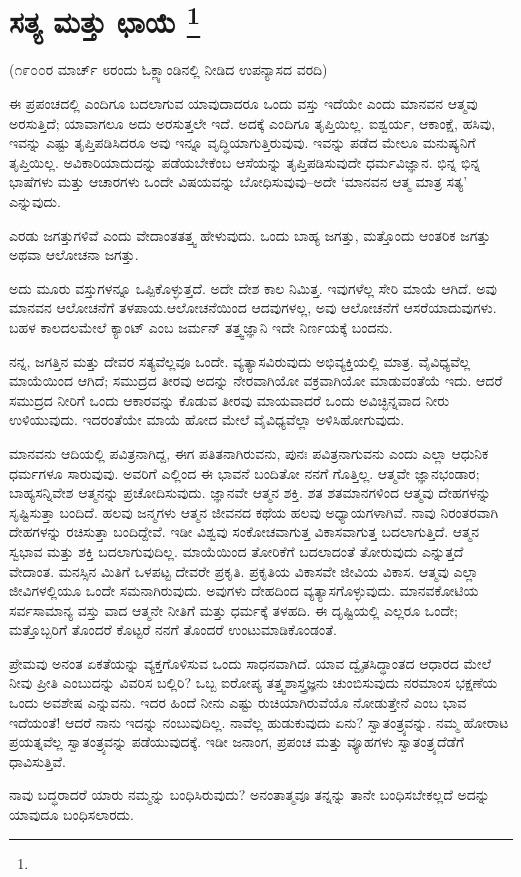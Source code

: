
\chapter[ಸತ್ಯ ಮತ್ತು ಛಾಯೆ ]{ಸತ್ಯ ಮತ್ತು ಛಾಯೆ \protect\footnote{}}

\centerline{(೧೯೦೦ರ ಮಾರ್ಚ್​ ೮ರಂದು ಓಕ್ಲ್ಯಾಂಡಿನಲ್ಲಿ ನೀಡಿದ ಉಪನ್ಯಾಸದ ವರದಿ)}

ಈ ಪ್ರಪಂಚದಲ್ಲಿ ಎಂದಿಗೂ ಬದಲಾಗುವ ಯಾವುದಾದರೂ ಒಂದು ವಸ್ತು ಇದೆಯೇ ಎಂದು ಮಾನವನ ಆತ್ಮವು ಅರಸುತ್ತಿದೆ; ಯಾವಾಗಲೂ ಅದು ಅರಸುತ್ತಲೇ ಇದೆ. ಅದಕ್ಕೆ ಎಂದಿಗೂ ತೃಪ್ತಿಯಿಲ್ಲ. ಐಶ್ವರ್ಯ, ಆಕಾಂಕ್ಷೆ, ಹಸಿವು, ಇವನ್ನು ಎಷ್ಟು ತೃಪ್ತಿಪಡಿಸಿದರೂ ಅವು ಇನ್ನೂ ವೃದ್ಧಿಯಾಗುತ್ತಿರುವುವು. ಇವನ್ನು ಪಡೆದ ಮೇಲೂ ಮನುಷ್ಯನಿಗೆ ತೃಪ್ತಿಯಿಲ್ಲ. ಅವಿಕಾರಿಯಾದುದನ್ನು ಪಡೆಯಬೇಕೆಂಬ ಆಸೆಯನ್ನು ತೃಪ್ತಿಪಡಿಸುವುದೇ ಧರ್ಮವಿಜ್ಞಾನ. ಭಿನ್ನ ಭಿನ್ನ ಭಾಷೆಗಳು ಮತ್ತು ಆಚಾರಗಳು ಒಂದೇ ವಿಷಯವನ್ನು ಬೋಧಿಸುವುವು–ಅದೇ ‘ಮಾನವನ ಆತ್ಮ ಮಾತ್ರ ಸತ್ಯ’ ಎನ್ನುವುದು.

ಎರಡು ಜಗತ್ತುಗಳಿವೆ ಎಂದು ವೇದಾಂತತತ್ತ್ವ ಹೇಳುವುದು. ಒಂದು ಬಾಹ್ಯ ಜಗತ್ತು, ಮತ್ತೊಂದು ಆಂತರಿಕ ಜಗತ್ತು ಅಥವಾ ಆಲೋಚನಾ ಜಗತ್ತು.

ಅದು ಮೂರು ವಸ್ತುಗಳನ್ನೂ ಒಪ್ಪಿಕೊಳ್ಳುತ್ತದೆ. ಅದೇ ದೇಶ ಕಾಲ ನಿಮಿತ್ತ. ಇವುಗಳೆಲ್ಲ ಸೇರಿ ಮಾಯೆ ಆಗಿದೆ. ಅವು ಮಾನವನ ಆಲೋಚನೆಗೆ ತಳಪಾಯ.ಆಲೋಚನೆಯಿಂದ ಆದವುಗಳಲ್ಲ, ಅವು ಆಲೋಚನೆಗೆ ಆಸರೆಯಾದುವುಗಳು. ಬಹಳ ಕಾಲದಲಮೇಲೆ ಕ್ಯಾಂಟ್​ ಎಂಬ ಜರ್ಮನ್​ ತತ್ತ್ವಜ್ಞಾನಿ ಇದೇ ನಿರ್ಣಯಕ್ಕೆ ಬಂದನು.

ನನ್ನ, ಜಗತ್ತಿನ ಮತ್ತು ದೇವರ ಸತ್ಯವೆಲ್ಲವೂ ಒಂದೇ. ವ್ಯತ್ಯಾಸವಿರುವುದು ಅಭಿವ್ಯಕ್ತಿಯಲ್ಲಿ ಮಾತ್ರ. ವೈವಿಧ್ಯವೆಲ್ಲ ಮಾಯೆಯಿಂದ ಆಗಿದೆ; ಸಮುದ್ರದ ತೀರವು ಅದನ್ನು ನೇರವಾಗಿಯೋ ವಕ್ರವಾಗಿಯೋ ಮಾಡುವಂತೆಯೆ ಇದು. ಆದರೆ ಸಮುದ್ರದ ನೀರಿಗೆ ಒಂದು ಆಕಾರವನ್ನು ಕೊಡುವ ತೀರವು ಮಾಯವಾದರೆ ಒಂದು ಅವಿಚ್ಛಿನ್ನವಾದ ನೀರು ಉಳಿಯುವುದು. ಇದರಂತೆಯೇ ಮಾಯೆ ಹೋದ ಮೇಲೆ ವೈವಿಧ್ಯವೆಲ್ಲಾ ಅಳಿಸಿಹೋಗುವುದು.

ಮಾನವನು ಆದಿಯಲ್ಲಿ ಪವಿತ್ರನಾಗಿದ್ದ, ಈಗ ಪತಿತನಾಗಿರುವನು, ಪುನಃ ಪವಿತ್ರನಾಗುವನು ಎಂದು ಎಲ್ಲಾ ಆಧುನಿಕ ಧರ್ಮಗಳೂ ಸಾರುವುವು. ಅವರಿಗೆ ಎಲ್ಲಿಂದ ಈ ಭಾವನೆ ಬಂದಿತೋ ನನಗೆ ಗೊತ್ತಿಲ್ಲ. ಆತ್ಮವೇ ಜ್ಞಾನಭಂಡಾರ; ಬಾಹ್ಯಸನ್ನಿವೇಶ ಆತ್ಮನನ್ನು ಪ್ರಚೋದಿಸುವುದು. ಜ್ಞಾನವೇ ಆತ್ಮನ ಶಕ್ತಿ. ಶತ ಶತಮಾನಗಳಿಂದ ಆತ್ಮವು ದೇಹಗಳನ್ನು ಸೃಷ್ಟಿಸುತ್ತಾ ಬಂದಿದೆ. ಹಲವು ಜನ್ಮಗಳು ಆತ್ಮನ ಜೀವನದ ಕಥೆಯ ಹಲವು ಅಧ್ಯಾಯಗಳಾಗಿವೆ. ನಾವು ನಿರಂತರವಾಗಿ ದೇಹಗಳನ್ನು ರಚಿಸುತ್ತಾ ಬಂದಿದ್ದೇವೆ. ಇಡೀ ವಿಶ್ವವು ಸಂಕೋಚವಾಗುತ್ತ ವಿಕಾಸವಾಗುತ್ತ ಬದಲಾಗುತ್ತಿದೆ. ಆತ್ಮನ ಸ್ವಭಾವ ಮತ್ತು ಶಕ್ತಿ ಬದಲಾಗುವುದಿಲ್ಲ. ಮಾಯೆಯಿಂದ ತೋರಿಕೆಗೆ ಬದಲಾದಂತೆ ತೋರುವುದು ಎನ್ನುತ್ತದೆ ವೇದಾಂತ. ಮನಸ್ಸಿನ ಮಿತಿಗೆ ಒಳಪಟ್ಟ ದೇವರೇ ಪ್ರಕೃತಿ. ಪ್ರಕೃತಿಯ ವಿಕಾಸವೇ ಜೀವಿಯ ವಿಕಾಸ. ಆತ್ಮವು ಎಲ್ಲಾ ಜೀವಿಗಳಲ್ಲಿಯೂ ಒಂದೇ ಸಮನಾಗಿರುವುದು. ಅವುಗಳು ದೇಹದಿಂದ ವ್ಯತ್ಯಾಸಗೊಳ್ಳುವುದು. ಮಾನವಕೋಟಿಯ ಸರ್ವಸಾಮಾನ್ಯ ವಸ್ತು ವಾದ ಆತ್ಮನೇ ನೀತಿಗೆ ಮತ್ತು ಧರ್ಮಕ್ಕೆ ತಳಹದಿ. ಈ ದೃಷ್ಟಿಯಲ್ಲಿ ಎಲ್ಲರೂ ಒಂದೇ; ಮತ್ತೊಬ್ಬರಿಗೆ ತೊಂದರೆ ಕೊಟ್ಟರೆ ನನಗೆ ತೊಂದರೆ ಉಂಟುಮಾಡಿಕೊಂಡಂತೆ.

ಪ್ರೇಮವು ಅನಂತ ಏಕತೆಯನ್ನು ವ್ಯಕ್ತಗೊಳಿಸುವ ಒಂದು ಸಾಧನವಾಗಿದೆ. ಯಾವ ದ್ವೈತಸಿದ್ಧಾಂತದ ಆಧಾರದ ಮೇಲೆ ನೀವು ಪ್ರೀತಿ ಎಂಬುದನ್ನು ವಿವರಿಸ ಬಲ್ಲಿರಿ? ಒಬ್ಬ ಐರೋಪ್ಯ ತತ್ತ್ವಶಾಸ್ತ್ರಜ್ಞನು ಚುಂಬಿಸುವುದು ನರಮಾಂಸ ಭಕ್ಷಣೆಯ ಒಂದು ಅವಶೇಷ ಎನ್ನುವನು. ಇದರ ಹಿಂದೆ ನೀನು ಎಷ್ಟು ರುಚಿಯಾಗಿರುವೆಯೊ ನೋಡುತ್ತೇನೆ ಎಂಬ ಭಾವ ಇದೆಯಂತೆ! ಆದರೆ ನಾನು ಇದನ್ನು ನಂಬುವುದಿಲ್ಲ. ನಾವೆಲ್ಲ ಹುಡುಕುವುದು ಏನು? ಸ್ವಾತಂತ್ರ್ಯವನ್ನು. ನಮ್ಮ ಹೋರಾಟ ಪ್ರಯತ್ನವೆಲ್ಲ ಸ್ವಾತಂತ್ರ್ಯವನ್ನು ಪಡೆಯುವುದಕ್ಕೆ. ಇಡೀ ಜನಾಂಗ, ಪ್ರಪಂಚ ಮತ್ತು ವ್ಯೂಹಗಳು ಸ್ವಾತಂತ್ರ್ಯದೆಡೆಗೆ ಧಾವಿಸುತ್ತಿವೆ.

ನಾವು ಬದ್ಧರಾದರೆ ಯಾರು ನಮ್ಮನ್ನು ಬಂಧಿಸಿರುವುದು? ಅನಂತಾತ್ಮವೂ ತನ್ನನ್ನು ತಾನೇ ಬಂಧಿಸಬೇಕಲ್ಲದೆ ಅದನ್ನು ಯಾವುದೂ ಬಂಧಿಸಲಾರದು.

